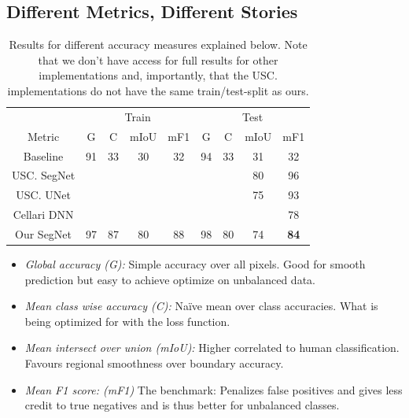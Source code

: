 \documentclass[
    ,title     = {{Image Segmentation for Smart Agriculture}}
    ,subject   = {{This is the subject of my work}}
    ,papersize = {{a1paper}}
    ,nocrop
]{dtuposter}
\begin{document}
\begin{dtupostercontent}



\section{Different Metrics, Different Stories}


\begin{table}
	\begin{tabular}{c|cccc|cccc|}
		
		\rule[-1ex]{0pt}{2.5ex}  & \multicolumn{4}{c|}{Train} &  \multicolumn{4}{c|}{Test} \\ 
		
		\rule[-1ex]{0pt}{2.5ex} Metric  & G & C &mIoU&  mF1 & G & C & mIoU& mF1 \\ 
		\hline
		\rule[-1ex]{0pt}{2.5ex} Baseline& 91& 33 &30  &32  &94  &33  &31 &32  \\ 
		
		\rule[-1ex]{0pt}{2.5ex} USC. SegNet    &  &  &  &  &  & &   80 &96  \\ 
		\rule[-1ex]{0pt}{2.5ex} USC. UNet   &  &  &  &  &  & &75 &93  \\ 
		\rule[-1ex]{0pt}{2.5ex} Cellari DNN   &  &  &  &  &  & & &78  \\ 
		\hline 
		\rule[-1ex]{0pt}{2.5ex} Our SegNet & 97 & 87 & 80 &88  & 98  &80&74&\textbf{84}  \\ 
	\end{tabular} 
\caption{Results for different accuracy measures explained below. Note that we don't have access for full results for other implementations and, importantly, that the USC. implementations do not have the same train/test-split as ours.}
\end{table}

\begin{itemize}
	\item \textit{Global accuracy (G):} Simple accuracy over all pixels. Good for smooth prediction but easy to achieve optimize on unbalanced data.
	\item \textit{Mean class wise accuracy (C):} Naïve mean over class accuracies. What is being optimized for with the loss function.
	\item \textit{Mean intersect over union (mIoU):} Higher correlated to human classification. Favours regional smoothness over boundary accuracy.
	\item \textit{Mean F1 score: (mF1)} The benchmark: Penalizes false positives and gives less credit to true negatives and is thus better for unbalanced classes. 
\end{itemize}



\end{dtupostercontent}
\end{document}
